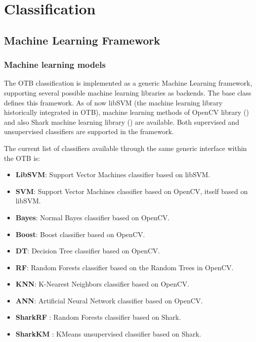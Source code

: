 \chapter{Classification}

\section{Machine Learning Framework}

\subsection{Machine learning models}
\label{sec:MLGenericFramework}

The OTB classification is implemented as a generic Machine Learning
framework, supporting several possible machine learning libraries as backends.
The base class  defines this framework.
As of now libSVM (the machine learning library historically integrated in OTB),
machine learning methods of OpenCV library (\cite{opencv_library}) and also
Shark machine learning library (\cite{shark_library}) are available. Both
supervised and unsupervised classifiers are supported in the framework.

The current list of classifiers available through the same generic interface within the OTB is:

\begin{itemize}
  \item \textbf{LibSVM}: Support Vector Machines classifier based on libSVM.
  \item \textbf{SVM}: Support Vector Machines classifier based on OpenCV, itself based on libSVM.
  \item \textbf{Bayes}: Normal Bayes classifier based on OpenCV.
  \item \textbf{Boost}: Boost classifier based on OpenCV.
  \item \textbf{DT}: Decision Tree classifier based on OpenCV.
  \item \textbf{RF}: Random Forests classifier based on the Random Trees in OpenCV.
  \item \textbf{KNN}: K-Nearest Neighbors classifier based on OpenCV.
  \item \textbf{ANN}: Artificial Neural Network classifier based on OpenCV.
  \item \textbf{SharkRF} : Random Forests classifier based on Shark.
  \item \textbf{SharkKM} : KMeans unsupervised classifier based on Shark.
\end{itemize}

